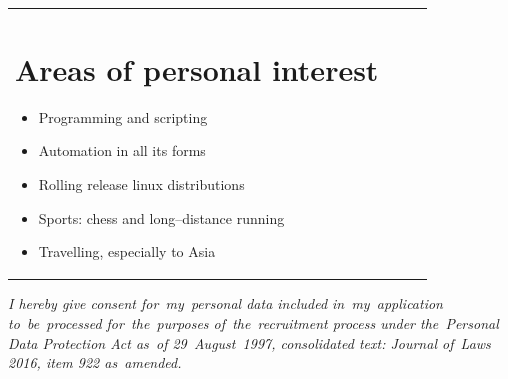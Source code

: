 \documentclass[a4paper,10pt]{article}
\begin{document}
\begin{tabular}{ P{90.5mm} P{14mm} P{85.5mm} @{}m{0pt}@{} }
\section{Areas of personal interest}
\begin{itemize}[leftmargin=15pt,itemsep=3pt]
  \item Programming and scripting
  \item Automation in all its forms
  \item Rolling release linux distributions
  \item Sports: chess and long--distance running
  \item Travelling, especially to Asia
\end{itemize}
\\
\end{tabular}

\vspace{24pt}
{\small\textit{
I hereby give consent for~my~personal data included in~my~application to~be~processed
for~the~purposes of~the~recruitment process under the~Personal Data Protection Act as~of 29~August~1997,
consolidated text: Journal of~Laws 2016, item 922 as~amended.}\par
}
\end{document}

